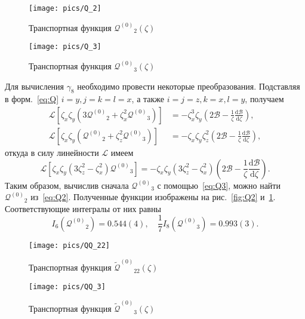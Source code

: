 \documentclass[a4paper,12pt]{article}
\newcommand{\dd}{\mathrm{d}}
\newcommand{\der}[2][]{\frac{\dd#1}{\dd#2}}
\newcommand{\Q}{\ensuremath{\mathcal{Q}^{(0)}}}
\newcommand{\QQ}{\ensuremath{\tilde{\mathcal{Q}}^{(0)}}}
\begin{document}
\begin{figure}
    \centering
    \begin{minipage}[b]{0.5\textwidth}
        \centering
        \texttt{[image: pics/Q\_2]}
        \caption{Транспортная функция \(\Q_2(\zeta)\)}
        \label{fig:Q2}
    \end{minipage}%
    \begin{minipage}[b]{0.5\textwidth}
        \centering
        \texttt{[image: pics/Q\_3]}
        \caption{Транспортная функция \(\Q_3(\zeta)\)}
        \label{fig:Q3}
    \end{minipage}
\end{figure}

Для вычисления \(\gamma_8\) необходимо провести некоторые преобразования.
Подставляя в форм.~\eqref{eq:Q} \(i=y, j=k=l=x\), а также \(i=j=z, k=x, l=y\), получаем
\begin{align}
    \mathcal{L}\left[ \zeta_x\zeta_y \left( 3\Q_2+\zeta_x^2\Q_3 \right) \right]
        &= -\zeta_x^3\zeta_y\left(2\mathcal{B} - \frac1\zeta\der[\mathcal{B}]{\zeta}\right), \label{eq:Q2}\\
    \mathcal{L}\left[ \zeta_x\zeta_y \left( \Q_2+\zeta_z^2\Q_3 \right) \right]
        &= -\zeta_x\zeta_y\zeta_z^2\left(2\mathcal{B} - \frac1\zeta\der[\mathcal{B}]{\zeta}\right),
\end{align}
откуда в силу линейности \(\mathcal{L}\) имеем
\begin{equation}\label{eq:Q3}
    \mathcal{L}\left[ \zeta_x\zeta_y \left( 3\zeta_z^2-\zeta_x^2 \right)\Q_3 \right]
        = -\zeta_x\zeta_y\left( 3\zeta_z^2-\zeta_x^2 \right)\left(2\mathcal{B} - \frac1\zeta\der[\mathcal{B}]{\zeta}\right).
\end{equation}
Таким образом, вычислив сначала \(\Q_3\) с помощью~\eqref{eq:Q3}, можно найти \(\Q_2\) из~\eqref{eq:Q2}.
Полученные функции изображены на рис.~\ref{fig:Q2} и~\ref{fig:Q3}.
Соответствующие интегралы от них равны
\begin{equation}\label{eq:gamma8a}
    I_6(\Q_2) = 0.544(4), \quad \frac17 I_8(\Q_3) = 0.993(3).
\end{equation}

\begin{figure}
    \centering
    \begin{minipage}[b]{0.5\textwidth}
        \centering
        \texttt{[image: pics/QQ\_22]}
        \caption{Транспортная функция \(\QQ_{22}(\zeta)\)}
        \label{fig:QQ22}
    \end{minipage}%
    \begin{minipage}[b]{0.5\textwidth}
        \centering
        \texttt{[image: pics/QQ\_3]}
        \caption{Транспортная функция \(\QQ_3(\zeta)\)}
        \label{fig:QQ3}
    \end{minipage}
\end{figure}
\end{document}
